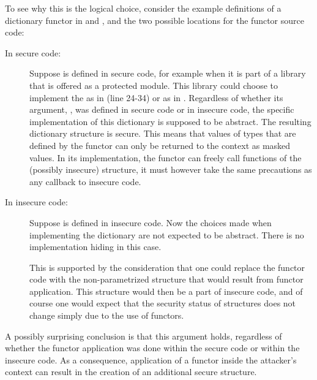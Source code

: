 To see why this is the logical choice, consider the example definitions of a dictionary functor in  and , and the two possible locations for the functor source code:
\begin{description}
\item[In secure code:] 
Suppose  is defined in secure code, for example when it is part of a library that is offered as a protected module.
This library could choose to implement the  as in  (line 24-34) or as in .
Regardless of whether its argument, , was defined in secure code or in insecure code, the specific implementation of this dictionary is supposed to be abstract.
The resulting dictionary structure is secure.
This means that values of types that are defined by the functor can only be returned to the context as masked values.
In its implementation, the functor can freely call functions of the (possibly insecure) structure, it must however take the same precautions as any callback to insecure code.
\item[In insecure code:] Suppose  is defined in insecure code.
Now the choices made when implementing the dictionary are not expected to be abstract. There is no implementation hiding in this case.

This is supported by the consideration that one could replace the functor code with the non-parametrized structure that would result from functor application.
This structure would then be a part of insecure code, and of course one would expect that the security status of structures does not change simply due to the use of functors.
\end{description}

A possibly surprising conclusion is that this argument holds, regardless of whether the functor application was done within the secure code or within the insecure code.
As a consequence, application of a functor inside the attacker's context can result in the creation of an additional secure structure.

